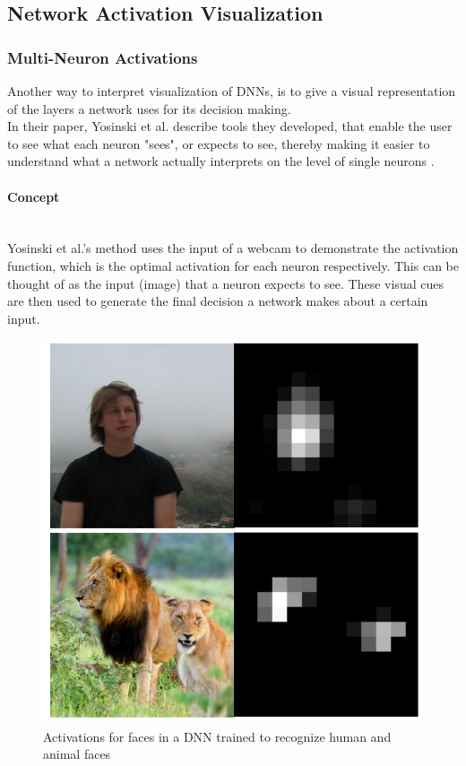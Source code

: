 \documentclass{acmsiggraph}               %
\newcommand{\paragraphbr}[1]{\paragraph{#1}\mbox{}\\}
\begin{document}
\subsection{Network Activation Visualization}
\subsubsection{Multi-Neuron Activations}
Another way to interpret visualization of DNNs, is to give a visual representation of the layers a network uses for its decision making.\\ 
In their paper, Yosinski et al. describe tools they developed, that enable the user to see what each neuron "sees", or expects to see, thereby making it easier to understand what a network actually interprets on the level of single neurons \cite{Yosinski2015}.

\paragraphbr{Concept}

Yosinski et al.'s method uses the input of a webcam to demonstrate the activation function, which is the optimal activation for each neuron respectively. This can be thought of as the input (image) that a neuron expects to see. These visual cues are then used to generate the final decision a network makes about a certain input.

\begin{figure}[H]
\includegraphics[scale=0.5]{detection_yosinski_et_al}
\caption{Activations for faces in a DNN trained to recognize human and animal faces \protect\cite{Yosinski2015}}
\label{fig:face_detection}
\centering
\end{figure}
\end{document}
